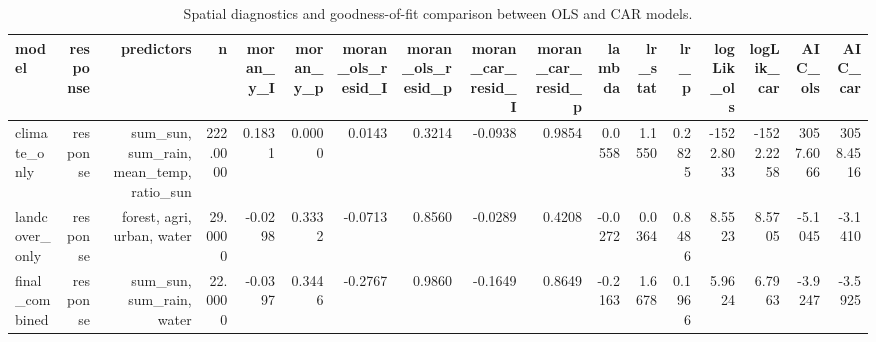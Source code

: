 \begin{table}[t]
\caption{Spatial diagnostics and goodness-of-fit comparison between OLS and CAR models.}
\label{tb:spatialdiag}
\centering
\begin{tabular}{lrrrrrrrrrrrrrrrr}
\hline
\textbf{model} & \textbf{response} & \textbf{predictors} & \textbf{n} & \textbf{moran\_y\_I} & \textbf{moran\_y\_p} & \textbf{moran\_ols\_resid\_I} & \textbf{moran\_ols\_resid\_p} & \textbf{moran\_car\_resid\_I} & \textbf{moran\_car\_resid\_p} & \textbf{lambda} & \textbf{lr\_stat} & \textbf{lr\_p} & \textbf{logLik\_ols} & \textbf{logLik\_car} & \textbf{AIC\_ols} & \textbf{AIC\_car}
\\
\hline
climate\_only & response & sum\_sun, sum\_rain, mean\_temp, ratio\_sun & 222.0000 & 0.1831 & 0.0000 & 0.0143 & 0.3214 & -0.0938 & 0.9854 & 0.0558 & 1.1550 & 0.2825 & -1522.8033 & -1522.2258 & 3057.6066 & 3058.4516 \\
landcover\_only & response & forest, agri, urban, water & 29.0000 & -0.0298 & 0.3332 & -0.0713 & 0.8560 & -0.0289 & 0.4208 & -0.0272 & 0.0364 & 0.8486 & 8.5523 & 8.5705 & -5.1045 & -3.1410 \\
final\_combined & response & sum\_sun, sum\_rain, water & 22.0000 & -0.0397 & 0.3446 & -0.2767 & 0.9860 & -0.1649 & 0.8649 & -0.2163 & 1.6678 & 0.1966 & 5.9624 & 6.7963 & -3.9247 & -3.5925 \\
\hline
\end{tabular}
\end{table}
